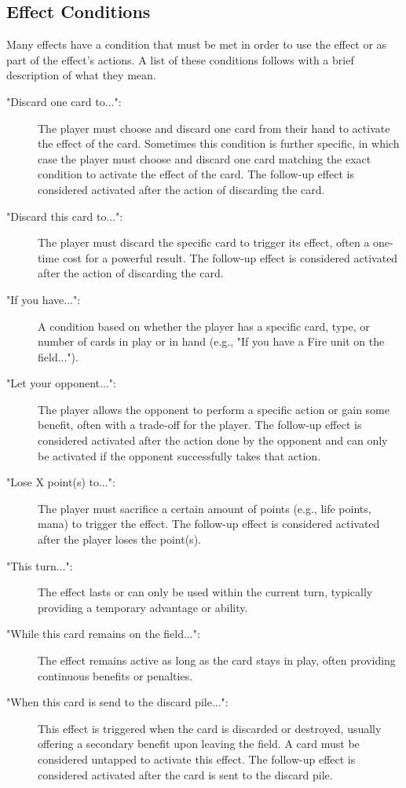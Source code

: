\subsection{Effect Conditions}
Many effects have a condition that must be met in order to use the effect or as part of the effect's actions. A list of these conditions follows with a brief description of what they mean.
\begin{description}
  \item["Discard one card to...":] The player must choose and discard one card from their hand to activate the effect of the card. Sometimes this condition is further specific, in which case the player must choose and discard one card matching the exact condition to activate the effect of the card. The  follow-up effect is considered activated after the action of discarding the card.
  \item["Discard this card to...":] The player must discard the specific card to trigger its effect, often a one-time cost for a powerful result. The  follow-up effect is considered activated after the action of discarding the card.
  \item["If you have...":] A condition based on whether the player has a specific card, type, or number of cards in play or in hand (e.g., "If you have a Fire unit on the field...").
  \item["Let your opponent...":] The player allows the opponent to perform a specific action or gain some benefit, often with a trade-off for the player. The follow-up effect is considered activated after the action done by the opponent and can only be activated if the opponent successfully takes that action.
  \item["Lose X point(s) to...":] The player must sacrifice a certain amount of points (e.g., life points, mana) to trigger the effect. The follow-up effect is considered activated after the player loses the point(s).
  \item["This turn...":] The effect lasts or can only be used within the current turn, typically providing a temporary advantage or ability.
  \item["While this card remains on the field...":] The effect remains active as long as the card stays in play, often providing continuous benefits or penalties.
  \item["When this card is send to the discard pile...":] This effect is triggered when the card is discarded or destroyed, usually offering a secondary benefit upon leaving the field. A card must be considered untapped to activate this effect. The follow-up effect is considered activated after the card is sent to the discard pile.

\end{description}
